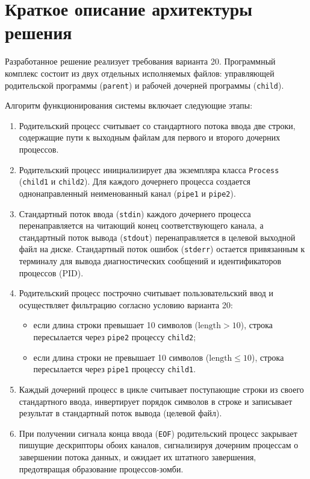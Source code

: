 \documentclass[11pt, a4paper]{article}
\begin{document}
\section{Краткое описание архитектуры решения}
Разработанное решение реализует требования варианта 20. Программный комплекс состоит из двух отдельных исполняемых файлов: управляющей родительской программы (\texttt{parent}) и рабочей дочерней программы (\texttt{child}).

Алгоритм функционирования системы включает следующие этапы:
\begin{enumerate}
    \item Родительский процесс считывает со стандартного потока ввода две строки, содержащие пути к выходным файлам для первого и второго дочерних процессов.
    \item Родительский процесс инициализирует два экземпляра класса \texttt{Process} (\texttt{child1} и \texttt{child2}). Для каждого дочернего процесса создается однонаправленный неименованный канал (\texttt{pipe1} и \texttt{pipe2}).
    \item Стандартный поток ввода (\texttt{stdin}) каждого дочернего процесса перенаправляется на читающий конец соответствующего канала, а стандартный поток вывода (\texttt{stdout}) перенаправляется в целевой выходной файл на диске. Стандартный поток ошибок (\texttt{stderr}) остается привязанным к терминалу для вывода диагностических сообщений и идентификаторов процессов (PID).
    \item Родительский процесс построчно считывает пользовательский ввод и осуществляет фильтрацию согласно условию варианта 20:
    \begin{itemize}
        \item если длина строки превышает 10 символов ($\text{length} > 10$), строка пересылается через \texttt{pipe2} процессу \texttt{child2};
        \item если длина строки не превышает 10 символов ($\text{length} \le 10$), строка пересылается через \texttt{pipe1} процессу \texttt{child1}.
    \end{itemize}
    \item Каждый дочерний процесс в цикле считывает поступающие строки из своего стандартного ввода, инвертирует порядок символов в строке и записывает результат в стандартный поток вывода (целевой файл).
    \item При получении сигнала конца ввода (\texttt{EOF}) родительский процесс закрывает пишущие дескрипторы обоих каналов, сигнализируя дочерним процессам о завершении потока данных, и ожидает их штатного завершения, предотвращая образование процессов-зомби.
\end{enumerate}
\end{document}
